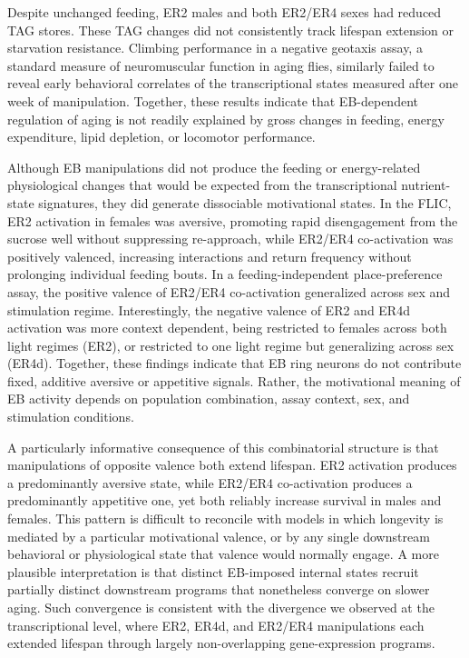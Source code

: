 Despite unchanged feeding, ER2 males and both ER2/ER4 sexes had reduced TAG stores. 
These TAG changes did not consistently track lifespan extension or starvation resistance. 
Climbing performance in a negative geotaxis assay, a standard measure of neuromuscular function in aging flies, similarly failed to reveal early behavioral correlates of the transcriptional states measured after one week of manipulation. 
Together, these results indicate that EB-dependent regulation of aging is not readily explained by gross changes in feeding, energy expenditure, lipid depletion, or locomotor performance.

Although EB manipulations did not produce the feeding or energy-related physiological changes that would be expected from the transcriptional nutrient-state signatures, they did generate dissociable motivational states.
In the FLIC, ER2 activation in females was aversive, promoting rapid disengagement from the sucrose well without suppressing re-approach, while ER2/ER4 co-activation was positively valenced, increasing interactions and return frequency without prolonging individual feeding bouts. 
In a feeding-independent place-preference assay, the positive valence of ER2/ER4 co-activation generalized across sex and stimulation regime. 
Interestingly, the negative valence of ER2 and ER4d activation was more context dependent, being restricted to females across both light regimes (ER2), or restricted to one light regime but generalizing across sex (ER4d). 
Together, these findings indicate that EB ring neurons do not contribute fixed, additive aversive or appetitive signals.
Rather, the motivational meaning of EB activity depends on population combination, assay context, sex, and stimulation conditions. 

A particularly informative consequence of this combinatorial structure is that manipulations of opposite valence both extend lifespan. 
ER2 activation produces a predominantly aversive state, while ER2/ER4 co-activation produces a predominantly appetitive one, yet both reliably 
increase survival in males and females. 
This pattern is difficult to reconcile with models in which longevity is mediated by a particular motivational valence, or by any single downstream behavioral or physiological state that valence would normally engage. 
A more plausible interpretation is that distinct EB-imposed internal states recruit partially distinct downstream programs that nonetheless converge on slower aging. 
Such convergence is consistent with the divergence we observed at the transcriptional level, where ER2, ER4d, and ER2/ER4 manipulations each extended lifespan through largely non-overlapping gene-expression programs.

